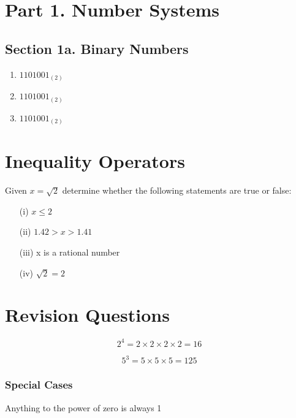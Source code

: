 \documentclass[]{report}
\begin{document}
\section*{Part 1. Number Systems}

\subsection*{Section 1a. Binary Numbers}

\begin{enumerate}
\item $1101001_{(2)}$
\item $1101001_{(2)}$
\item $1101001_{(2)}$
\end{enumerate}
\section{Inequality Operators}


Given $x = \sqrt{2}$ determine whether the following statements are true or false:

\begin{itemize}
\item[(i)] $x \leq 2$
\item[(ii)] $1.42 > x > 1.41$
\item[(iii)] x is a rational number
\item[(iv)] $\sqrt{2} = 2$
\end{itemize}

\section{Revision Questions}



\[  2^ 4 = 2 \times 2 \times 2 \times 2 = 16 \]

\[  5^ 3 = 5 \times 5 \times 5 =125 \]

\subsubsection{Special Cases}

Anything to the power of zero is always 1
\end{document}
